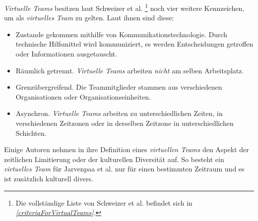 \documentclass[a4paper,11pt]{article}%
\renewcommand{\\}{\vspace*{0.5\baselineskip} \newline}
\begin{document}
\textit{Virtuelle Teams} besitzen laut Schweizer et al. \citep[S. 270]{schweitzer2010conceptualizing}\footnote{Die vollständige Liste von Schweizer et al. befindet sich in \textit{\autoref{criteriaForVirtualTeams}}.} noch vier weitere Kennzeichen, um als \textit{virtuelles Team} zu gelten. Laut ihnen sind diese:
\label{AnforderungenLautSchweitzer}
\begin{itemize}
\item Zustande gekommen mithilfe von Kommunikationstechnologie. Durch technische Hilfsmittel wird kommuniziert, es werden Entscheidungen getroffen oder Informationen ausgetauscht.
\item Räumlich getrennt. \textit{Virtuelle Teams} arbeiten \textit{nicht} am selben Arbeitsplatz.
\item Grenzübergreifend. Die Teammitglieder stammen aus verschiedenen Organisationen oder Organisationseinheiten.
\item Asynchron. \textit{Virtuelle Teams} arbeiten zu unterschiedlichen Zeiten, in verschiedenen Zeitzonen oder in derselben Zeitzone in unterschiedlichen Schichten.
\end{itemize}

Einige Autoren nehmen in ihre Definition eines \textit{virtuellen Teams} den Aspekt der zeitlichen Limitierung oder der kulturellen Diversität auf. So besteht ein \textit{virtuelles Team} für Jarvenpaa et al. \citep[S. 1-2]{jarvenpaa1999communication} nur für einen bestimmten Zeitraum und es ist zusätzlich kulturell divers.
\end{document}
